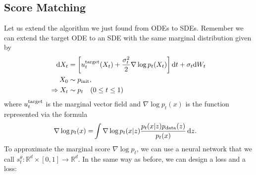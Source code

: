 \subsection{Score Matching}

Let us extend the algorithm we just found from ODEs to SDEs. Remember we can extend the target ODE to an SDE with the same marginal distribution given by
\begin{align}
\label{eq:sde_extension_restated}
    \mathrm{d} X_t &=\left[u^{\text{target}}_t(X_t)+\frac{\sigma_t^2}{2}\nabla\log p_t(X_t)\right]\mathrm{d} t +\sigma_t\mathrm{d} W_t\\
    X_0&\sim p_{\rm{init}},\quad \\
    \label{eq:marginal_ode_follows_marginal_path_restated}
    \Rightarrow X_t&\sim p_t\quad (0\leq t\leq 1)
\end{align}
where $u^{\text{target}}_t$ is the marginal vector field and $\nabla\log p_t(x)$ is the  function represented via the formula
\begin{align}
\label{eq:score_marginal_restated}
\nabla\log p_t(x) =&\int \nabla \log p_t(x|z)\frac{ p_t(x|z)p_{\rm{data}}(z)}{p_t(x)}\,\mathrm{d} z.
\end{align}
To approximate the marginal score $\nabla\log p_t$, we can use a neural network that we call  $s_t^\theta:\mathbb{R}^d\times[0,1]\to\mathbb{R}^d$. In the same way as before, we can design a  loss and a  loss:

